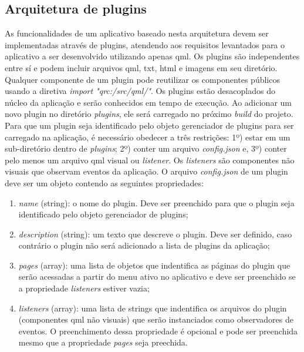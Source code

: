 \subsection{Arquitetura de plugins}
As funcionalidades de um aplicativo baseado nesta arquitetura devem ser implementadas através de plugins, atendendo aos requisitos levantados para o aplicativo a ser desenvolvido utilizando apenas qml. Os plugins são independentes entre sí e podem incluir arquivos qml, txt, html e imagens em seu diretório. Qualquer componente de um plugin pode reutilizar os componentes públicos usando a diretiva \textit{import "qrc:/src/qml/"}. Os plugins estão desacoplados do núcleo da aplicação e serão conhecidos em tempo de execução. Ao adicionar um novo plugin no diretório \textit{plugins}, ele será carregado no próximo \textit{build} do projeto. Para que um plugin seja identificado pelo objeto gerenciador de plugins para ser carregado na aplicação, é necessário obedecer a três restrições: 1º) estar em um sub-diretório dentro de \textit{plugins}; 2º) conter um arquivo \textit{config.json} e, 3º) conter pelo menos um arquivo qml visual ou \textit{listener}. Os \textit{listeners} são componentes não visuais que observam eventos da aplicação. O arquivo \textit{config.json} de um plugin deve ser um objeto contendo as seguintes propriedades:  
\begin{enumerate}
	\item \textit{name} (string): o nome do plugin. Deve ser preenchido para que o plugin seja identificado pelo objeto gerenciador de plugins;

	\item \textit{description} (string): um texto que descreve o plugin. Deve ser definido, caso contrário o plugin não será adicionado a lista de plugins da aplicação;

	\item \textit{pages} (array): uma lista de objetos que indentifica as páginas do plugin que serão acessadas a partir do menu ativo no aplicativo e deve ser preenchido se a propriedade \textit{listeners} estiver vazia;

	\item \textit{listeners} (array): uma lista de strings que indentifica os arquivos do plugin (componentes qml não visuais) que serão instanciados como observadores de eventos. O preenchimento dessa propriedade é opcional e pode ser preenchida mesmo que a propriedade \textit{pages} seja preechida.
\end{enumerate}

